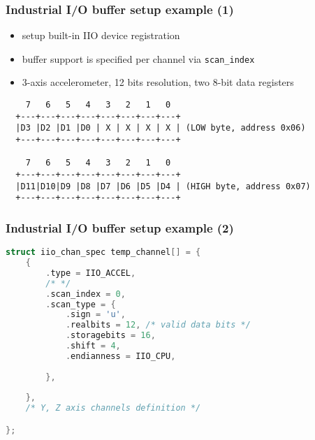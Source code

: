 \documentclass[aspectratio=169]{beamer}
\begin{document}
\begin{frame}[fragile]
\frametitle{Industrial I/O buffer setup example (1)}
\begin{itemize}
    \item setup built-in IIO device registration
    \item buffer support is specified per channel via \texttt{scan\_index}
    \item 3-axis accelerometer, 12 bits resolution, two 8-bit data registers
\end{itemize}
\begin{verbatim}
    7   6   5   4   3   2   1   0
  +---+---+---+---+---+---+---+---+
  |D3 |D2 |D1 |D0 | X | X | X | X | (LOW byte, address 0x06)
  +---+---+---+---+---+---+---+---+

    7   6   5   4   3   2   1   0
  +---+---+---+---+---+---+---+---+
  |D11|D10|D9 |D8 |D7 |D6 |D5 |D4 | (HIGH byte, address 0x07)
  +---+---+---+---+---+---+---+---+
\end{verbatim}
\end{frame}


\begin{frame}[fragile]
\frametitle{Industrial I/O buffer setup example (2)}
\begin{lstlisting}[language=C]
struct iio_chan_spec temp_channel[] = {
    {
        .type = IIO_ACCEL,
        /* */
        .scan_index = 0,
        .scan_type = {
            .sign = 'u',
            .realbits = 12, /* valid data bits */
            .storagebits = 16,
            .shift = 4,
            .endianness = IIO_CPU,
        
        },
    
    },
    /* Y, Z axis channels definition */

};

\end{lstlisting}
\end{frame}

\end{document}
